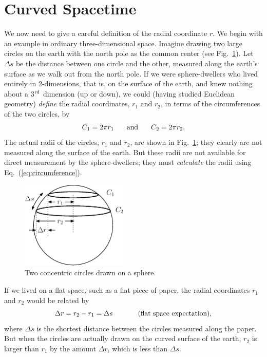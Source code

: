 \section{Curved Spacetime}
     
We now need to give a careful definition of the radial coordinate $r$.
We begin with an example in ordinary three-dimensional space.  Imagine
drawing two large circles on the earth with the north pole as the
common center (see Fig.~\ref{fig:sphere}).  Let $\Delta s$ be the distance
between one circle and the other, measured along the earth's surface
as we walk out from the north pole.  If we were sphere-dwellers who
lived entirely in 2-dimensions, that is, on the surface of the earth,
and knew nothing about a 3$^{\rm rd}$ dimension (up or down), we could
(having studied Euclidean geometry) {\em define} the radial
coordinates, $r_1$ and $r_2$, in terms of the circumferences of the
two circles, by
\begin{equation}
C_1 = 2\pi r_1\mbox{\hspace{.25in}and\hspace{.25in}}C_2 = 2\pi r_2.
\label{eq:circumference}
\end{equation}
The actual radii of the circles, $r_1$ and $r_2$, are shown in
Fig.~\ref{fig:sphere}; they clearly are not measured along the surface
of the earth.  But these radii are not available for direct
measurement by the sphere-dwellers; they must \textit{calculate} the
radii using Eq.~(\ref{eq:circumference}).
     
\begin{figure}[tbp]
\begin{center}
\includegraphics[width=2in]{gravity_and_geometry/sphere.eps}
\end{center}
\caption{Two concentric circles drawn on a sphere.}
\label{fig:sphere}
\end{figure}
     
If we lived on a flat space, such as a flat piece of paper, the radial
coordinates $r_1$ and $r_2$ would be related by
\begin{equation}
\Delta r = r_2 - r_1 = \Delta s \mbox{\hspace{0.5in}(flat space
  expectation)},
\label{eq:flat}
\end{equation}
where $\Delta s$ is the shortest distance between the circles measured
along the paper.  But when the circles are actually drawn on the
curved surface of the earth, $r_2$ is larger than $r_1$ by the amount
$\Delta r$, which is less than $\Delta s$.
     
